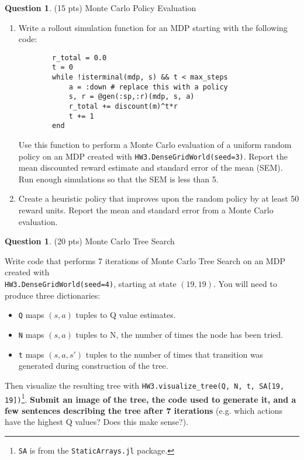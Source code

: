 \documentclass{article}
\theoremstyle{definition}
\newtheorem{question}[thm]{Question}
\begin{document}
\begin{samepage}
\begin{question} (15 pts) Monte Carlo Policy Evaluation
    \begin{enumerate}[label=\alph*)]
        \item Write a rollout simulation function for an MDP starting with the following code:
            \begin{verbatim}
        r_total = 0.0
        t = 0
        while !isterminal(mdp, s) && t < max_steps
            a = :down # replace this with a policy
            s, r = @gen(:sp,:r)(mdp, s, a)
            r_total += discount(m)^t*r
            t += 1
        end
                \end{verbatim} Use this function to perform a Monte Carlo evaluation of a uniform random policy on an MDP created with \texttt{HW3.DenseGridWorld(seed=3)}. Report the mean discounted reward estimate and standard error of the mean (SEM). Run enough simulations so that the SEM is less than 5.
         \item Create a heuristic policy that improves upon the random policy by at least 50 reward units. Report the mean and standard error from a Monte Carlo evaluation.
    \end{enumerate}
\end{question}
\end{samepage}

\begin{question} \label{q:mcts} (20 pts) Monte Carlo Tree Search
    
    Write code that performs 7 iterations of Monte Carlo Tree Search on an MDP created with \\
    \texttt{HW3.DenseGridWorld(seed=4)},
    starting at state $(19, 19)$. You will need to produce three dictionaries:
    \begin{itemize}[noitemsep]
        \item \texttt{Q} maps $(s, a)$ tuples to Q value estimates.
        \item \texttt{N} maps $(s, a)$ tuples to N, the number of times the node has been tried.
        \item \texttt{t} maps $(s, a, s')$ tuples to the number of times that transition was generated during construction of the tree.
    \end{itemize}
    Then visualize the resulting tree with \texttt{HW3.visualize\_tree(Q, N, t, SA[19, 19])}\footnote{\texttt{SA} is from the \texttt{StaticArrays.jl} package.}. \textbf{Submit an image of the tree, the code used to generate it, and a few sentences describing the tree after 7 iterations} (e.g. which actions have the highest Q values? Does this make sense?).
    
\end{question}
\end{document}
